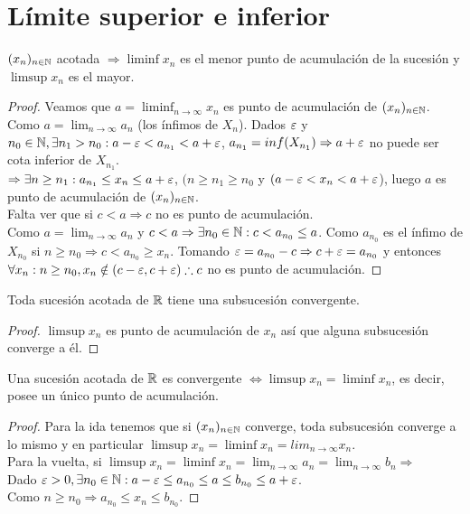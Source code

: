 \section{Límite superior e inferior}

\begin{theorem}
  $(x_n)_{n \in \mathbb{N}}$ acotada $\Rightarrow \liminf x_n$ es el menor punto de acumulación de la sucesión y $\limsup x_n$ es el mayor.

  \begin{proof}
    Veamos que $a = \liminf_{n \to \infty} x_n$ es punto de acumulación de $(x_n)_{n \in \mathbb{N}}$. \\
    Como $a = \lim_{n \to \infty} a_n$ (los ínfimos de $X_n$). Dados $\varepsilon$ y $n_0 \in \mathbb{N}, \exists n_1 > n_0 : a-\varepsilon < a_{n_1} < a+\varepsilon$, $a_{n_1} = inf(X_{n_1}) \Rightarrow a + \varepsilon$ no puede ser cota inferior de $X_{n_1}$. \\
    $\Rightarrow \exists n \geq n_1 : a_{n_1} \leq x_n \leq a+\varepsilon$, $(n \geq n_1 \geq n_0$ y $(a - \varepsilon < x_n < a + \varepsilon$), luego $a$ es punto de acumulación de $(x_n)_{n \in \mathbb{N}}$. \\
    Falta ver que si $c < a \Rightarrow c$ no es punto de acumulación. \\
    Como $a = \lim_{n \to \infty} a_n$ y $c < a \Rightarrow \exists n_0 \in \mathbb{N} : c < a_{n_0} \leq a$. Como $a_{n_0}$ es el ínfimo de $X_{n_0}$ si $n \geq n_0 \Rightarrow c < a_{n_0} \geq x_n$. Tomando $\varepsilon = a_{n_0} - c \Rightarrow c+\varepsilon = a_{n_0}$ y entonces $\forall x_n: n \geq n_0, x_n \notin (c - \varepsilon, c + \varepsilon) \therefore c$ no es punto de acumulación.
  \end{proof}
\end{theorem}

\begin{theorem}
  Toda sucesión acotada de $\mathbb{R}$ tiene una subsucesión convergente.
  \begin{proof}
    $\limsup x_n$ es punto de acumulación de $x_n$ así que alguna subsucesión converge a él.
  \end{proof}
\end{theorem}

\begin{corollary}
  Una sucesión acotada de $\mathbb{R}$ es convergente $\iff \limsup x_n = \liminf x_n$, es decir, posee un único punto de acumulación.
  \begin{proof}
    Para la ida tenemos que si $(x_n)_{n \in \mathbb{N}}$ converge, toda subsucesión converge a lo mismo y en particular $\limsup x_n = \liminf x_n = lim_{n \to \infty} x_n$. \\
    Para la vuelta, si $\limsup x_n = \liminf x_n = \lim_{n \to \infty} a_n = \lim_{n \to \infty} b_n \Rightarrow$ \\
    Dado $\varepsilon > 0, \exists n_0 \in \mathbb{N} : a - \varepsilon \leq a_{n_0} \leq a \leq b_{n_0} \leq a + \varepsilon$. \\
    Como $n \geq n_0 \Rightarrow a_{n_0} \leq x_n \leq b_{n_0}$.
  \end{proof}
\end{corollary}


